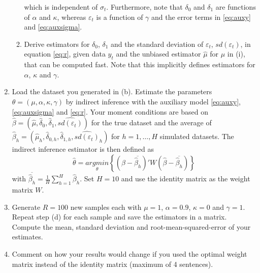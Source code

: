 \documentclass{article}
\begin{document}
\begin{enumerate}[resume,label=(\alph*)]
\begin{enumerate}[label=(\roman*)]
    which is independent of $\sigma_t$. Furthermore, note that $\delta_0$ and $\delta_1$ are functions of $\alpha$ and $\kappa$, whereas $\varepsilon_t$ is a function of $\gamma$ and the error terms in \eqref{eq:auxy} and \eqref{eq:auxsigma}.
    \item Derive estimators for $\delta_0$, $\delta_1$ and the standard deviation of $\varepsilon_t$, $sd(\varepsilon_t)$, in equation \eqref{eq:r}, given data $y_t$ and the unbiased estimator $\hat{\mu}$ for $\mu$ in (i), that can be computed fast. Note that this implicitly defines estimators for $\alpha$, $\kappa$ and $\gamma$.
    \end{enumerate}
\item Load the dataset you generated in (b). Estimate the parameters $\theta=(\mu,\alpha,\kappa,\gamma)$ by indirect inference with the auxiliary model \eqref{eq:auxy}, \eqref{eq:auxsigma} and \eqref{eq:r}. Your moment conditions are based on $\hat{\beta}=(\hat{\mu},\hat{\delta}_0,\hat{\delta}_1,\widehat{sd(\varepsilon_t)})$ for the true dataset and the average of $\hat{\beta}_h=(\hat{\mu}_h,\hat{\delta}_{0,h},\hat{\delta}_{1,h},\widehat{sd(\varepsilon_t)}_h)$ for $h=1,\dots,H$ simulated datasets. The indirect inference estimator is then defined as
    $$\hat{\theta} = \underset{\theta}{argmin}\left\{ \left(\hat{\beta}-\overline{\hat{\beta}_h}\right)'W \left(\hat{\beta}-\overline{\hat{\beta}_h}\right) \right\}$$
    with $\overline{\hat{\beta}_h}=\frac{1}{H}\sum_{h=1}^{H}\hat{\beta}_h$. Set $H=10$ and use the identity matrix as the weight matrix $W$.
\item Generate $R=100$ new samples each with $\mu=1$, $\alpha=0.9$, $\kappa=0$ and $\gamma=1$. Repeat step (d) for each sample and save the estimators in a matrix. Compute the mean, standard deviation and root-mean-squared-error of your estimates.
\item Comment on how your results would change if you used the optimal weight matrix instead of the identity matrix (maximum of 4 sentences).
\end{enumerate}
\end{document}
